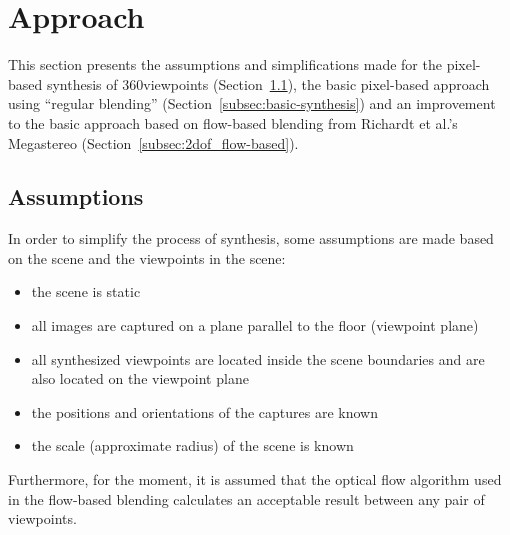 
\section{Approach} \label{sec:approach}
This section presents the assumptions and simplifications made for the pixel-based synthesis of 360\degree viewpoints (Section~\ref{subsec:assumptions}), the basic pixel-based approach using ``regular blending'' (Section~\ref{subsec:basic-synthesis}) and an improvement to the basic approach based on flow-based blending from Richardt et al.'s Megastereo \cite{megastereo} (Section~\ref{subsec:2dof_flow-based}).

\subsection{Assumptions}\label{subsec:assumptions}
In order to simplify the process of synthesis, some assumptions are made based on the scene and the viewpoints in the scene:

\begin{itemize}
  \item the scene is static
  \item all images are captured on a plane parallel to the floor (viewpoint plane)
  \item all synthesized viewpoints are located inside the scene boundaries and are also located on the viewpoint plane
  \item the positions and orientations of the captures are known
  \item the scale (approximate radius) of the scene is known
\end{itemize}

\noindent
Furthermore, for the moment, it is assumed that the optical flow algorithm used in the flow-based blending calculates an acceptable result between any pair of viewpoints.

